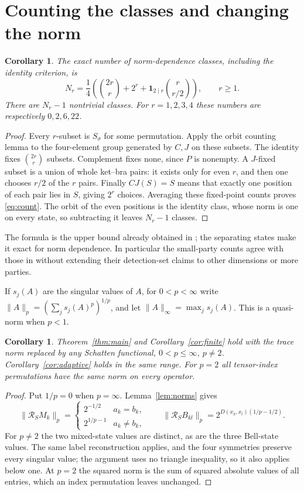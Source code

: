 \documentclass[11pt]{article}
\newtheorem{corollary}[theorem]{Corollary}
\newcommand{\norm}[1]{\lVert #1\rVert}
\newcommand{\R}{\mathcal R}
\begin{document}
\section{Counting the classes and changing the norm}

\begin{corollary}\label{cor:count}
The exact number of norm-dependence classes, including the identity
criterion, is
\begin{equation}\label{eq:count}
 N_r=\frac14\left(\binom{2r}{r}+2^r+
       \mathbf1_{2\mid r}\binom r{r/2}\right),\qquad r\geq1.
\end{equation}
There are $N_r-1$ nontrivial classes. For $r=1,2,3,4$ these numbers
are respectively $0,2,6,22$.
\end{corollary}
\begin{proof}
Every $r$-subset is $S_\sigma$ for some permutation. Apply the orbit
counting lemma to the four-element group generated by $C,J$ on these
subsets. The identity fixes $\binom{2r}{r}$ subsets. Complement fixes
none, since $P$ is nonempty. A $J$-fixed subset is a union of whole
ket--bra pairs: it exists only for even $r$, and then one chooses $r/2$
of the $r$ pairs. Finally $CJ(S)=S$ means that exactly one position of
each pair lies in $S$, giving $2^r$ choices. Averaging these fixed-point
counts proves \eqref{eq:count}. The orbit of the even positions is
the identity class, whose norm is one on every state, so subtracting it
leaves $N_r-1$ classes.
\end{proof}

The formula is the upper bound already obtained in
\cite[Theorem 3, equation (2)]{CW}; the separating states make it exact
for norm dependence. In particular the small-party counts agree with
those in \cite[Section IV]{CW} without extending their detection-set
claims to other dimensions or more parties.

If $s_j(A)$ are the singular values of $A$, for $0<p<\infty$ write
$\norm A_p=(\sum_j s_j(A)^p)^{1/p}$, and let
$\norm A_\infty=\max_j s_j(A)$. This is a quasi-norm when $p<1$.
\begin{corollary}\label{cor:schatten}
Theorem~\ref{thm:main} and Corollary~\ref{cor:finite} hold with the
trace norm replaced by any Schatten functional, $0<p\leq\infty$,
$p\ne2$. Corollary~\ref{cor:adaptive} holds in the same range.
For $p=2$ all tensor-index permutations have the same norm
on every operator.
\end{corollary}
\begin{proof}
Put $1/p=0$ when $p=\infty$. Lemma~\ref{lem:norms} gives
\[
 \norm{\R_S M_k}_p=
 \begin{cases}2^{-1/2}&a_k=b_k,\\2^{1/p-1}&a_k\ne b_k,\end{cases}
 \qquad
 \norm{\R_S B_{kl}}_p=2^{D(x_k,x_l)(1/p-1/2)}.
\]
For $p\ne2$ the two mixed-state values are distinct, as are the three
Bell-state values. The same label reconstruction applies, and the
four symmetries preserve every singular value; the argument uses no
triangle inequality, so it also applies below one. At $p=2$ the squared norm
is the sum of squared absolute values of all entries, which an index
permutation leaves unchanged.
\end{proof}
\end{document}
